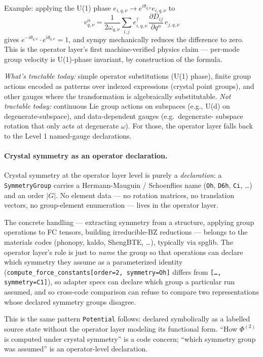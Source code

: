 \documentclass[11pt,a4paper]{article}
\begin{document}
Example: applying the U(1) phase $e_{i,q,\nu} \to e^{i\theta_{q,\nu}}
e_{i,q,\nu}$ to
\begin{equation*}
  v^\alpha_{q,\nu} = \frac{1}{2\omega_{q,\nu}} \sum_{i,j} e^\dagger_{i,q,\nu}\,
    \frac{\partial D_{ij}}{\partial q^\alpha}\, e_{j,q,\nu}
\end{equation*}
gives $e^{-i\theta_{q,\nu}} \cdot e^{i\theta_{q,\nu}} = 1$, and sympy
mechanically reduces the difference to zero. This is the operator layer's
first machine-verified physics claim --- per-mode group velocity is
U(1)-phase invariant, by construction of the formula.

\emph{What's tractable today:} simple operator substitutions (U(1)
phase), finite group actions encoded as patterns over indexed
expressions (crystal point groups), and other gauges where the
transformation is algebraically substitutable. \emph{Not tractable
today:} continuous Lie group actions on subspaces (e.g., U(d) on
degenerate-subspace), and data-dependent gauges (e.g.\ degenerate-
subspace rotation that only acts at degenerate $\omega$). For those,
the operator layer falls back to the Level 1 named-gauge declarations.

\paragraph{Crystal symmetry as an operator declaration.} Crystal symmetry
at the operator layer level is purely a \emph{declaration}: a
\texttt{SymmetryGroup} carries a Hermann-Mauguin / Schoenflies name
(\texttt{Oh}, \texttt{D6h}, \texttt{Ci}, \ldots) and an order $|G|$.
No element data --- no rotation matrices, no translation vectors, no
group-element enumeration --- lives in the operator layer.

The concrete handling --- extracting symmetry from a structure,
applying group operations to FC tensors, building irreducible-BZ
reductions --- belongs to the materials codes (phonopy, kaldo,
ShengBTE, \ldots), typically via spglib. The operator layer's role is just to
\emph{name} the group so that operations can declare which symmetry they
assume as a parameterized identity
(\texttt{compute\_force\_constants[order=2, symmetry=Oh]} differs from
\texttt{[\ldots, symmetry=C1]}), so adapter specs can declare which
group a particular run assumed, and so cross-code comparison can refuse
to compare two representations whose declared symmetry groups disagree.

This is the same pattern \texttt{Potential} follows: declared symbolically
as a labelled source state without the operator layer modeling its functional
form. ``How $\Phi^{(2)}$ is computed under crystal symmetry'' is a code
concern; ``which symmetry group was assumed'' is an operator-level
declaration.
\end{document}
